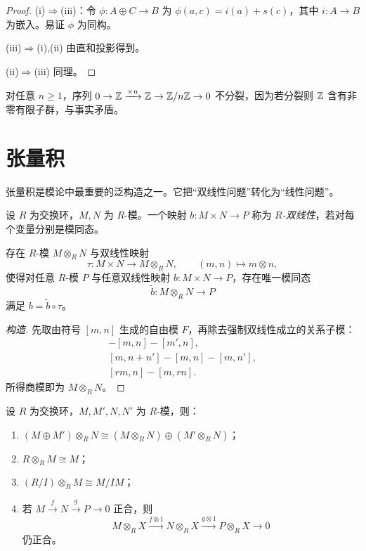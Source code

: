 \begin{proof}
(i)$\Rightarrow$(iii)：令 $\phi:A\oplus C\to B$ 为 $\phi(a,c)=i(a)+s(c)$，其中 $i:A\to B$ 为嵌入。易证 $\phi$ 为同构。

(iii)$\Rightarrow$(i),(ii) 由直和投影得到。

(ii)$\Rightarrow$(iii) 同理。
\end{proof}

\begin{example}
对任意 $n\ge 1$，序列 $0\to \mathbb{Z}\xrightarrow{\times n}\mathbb{Z}\to \mathbb{Z}/n\mathbb{Z}\to 0$ 不分裂，因为若分裂则 $\mathbb{Z}$ 含有非零有限子群，与事实矛盾。
\end{example}

\section{张量积}

张量积是模论中最重要的泛构造之一。它把“双线性问题”转化为“线性问题”。

\begin{definition}
设 $R$ 为交换环，$M,N$ 为 $R$-模。一个映射 $b:M\times N\to P$ 称为 \emph{$R$-双线性}，若对每个变量分别是模同态。
\end{definition}

\begin{theorem}[张量积的泛性质]
存在 $R$-模 $M\otimes_R N$ 与双线性映射
\[
 \tau:M\times N\to M\otimes_R N,
\qquad (m,n)\mapsto m\otimes n,
\]
使得对任意 $R$-模 $P$ 与任意双线性映射 $b:M\times N\to P$，存在唯一模同态
\[
 \tilde b:M\otimes_R N\to P
\]
满足 $b=\tilde b\circ \tau$。
\end{theorem}

\begin{proof}[构造]
先取由符号 $[m,n]$ 生成的自由模 $F$，再除去强制双线性成立的关系子模：
\begin{align*}
 [m+m',n]-[m,n]-[m',n],\\
 [m,n+n']-[m,n]-[m,n'],\\
 [rm,n]-[m,rn].
\end{align*}
所得商模即为 $M\otimes_R N$。
\end{proof}

\begin{proposition}
设 $R$ 为交换环，$M,M',N,N'$ 为 $R$-模，则：
\begin{enumerate}[label=(\roman*)]
\item $(M\oplus M')\otimes_R N\cong (M\otimes_R N)\oplus (M'\otimes_R N)$；
\item $R\otimes_R M\cong M$；
\item $(R/I)\otimes_R M\cong M/IM$；
\item 若 $M\xrightarrow{f}N\xrightarrow{g}P\to 0$ 正合，则
\[
 M\otimes_R X\xrightarrow{f\otimes 1} N\otimes_R X\xrightarrow{g\otimes 1} P\otimes_R X\to 0
\]
仍正合。
\end{enumerate}
\end{proposition}

